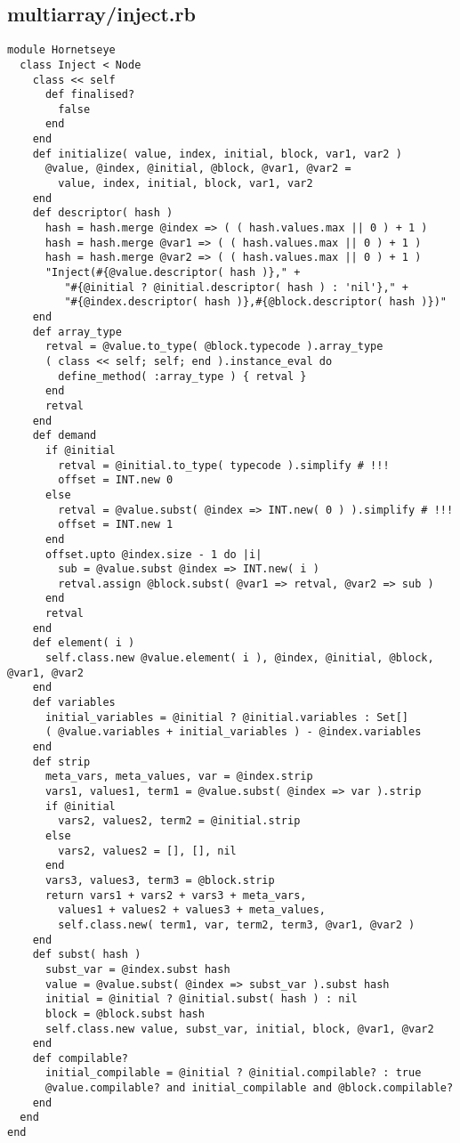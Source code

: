 \subsection{multiarray/inject.rb}\label{cha:multiarray-inject-rb}
\begin{lstlisting}
module Hornetseye
  class Inject < Node
    class << self
      def finalised?
        false
      end
    end
    def initialize( value, index, initial, block, var1, var2 )
      @value, @index, @initial, @block, @var1, @var2 =
        value, index, initial, block, var1, var2
    end
    def descriptor( hash )
      hash = hash.merge @index => ( ( hash.values.max || 0 ) + 1 )
      hash = hash.merge @var1 => ( ( hash.values.max || 0 ) + 1 )
      hash = hash.merge @var2 => ( ( hash.values.max || 0 ) + 1 )
      "Inject(#{@value.descriptor( hash )}," +
         "#{@initial ? @initial.descriptor( hash ) : 'nil'}," +
         "#{@index.descriptor( hash )},#{@block.descriptor( hash )})"
    end
    def array_type
      retval = @value.to_type( @block.typecode ).array_type
      ( class << self; self; end ).instance_eval do
        define_method( :array_type ) { retval }
      end
      retval
    end
    def demand
      if @initial
        retval = @initial.to_type( typecode ).simplify # !!!
        offset = INT.new 0
      else
        retval = @value.subst( @index => INT.new( 0 ) ).simplify # !!!
        offset = INT.new 1
      end
      offset.upto @index.size - 1 do |i|
        sub = @value.subst @index => INT.new( i )
        retval.assign @block.subst( @var1 => retval, @var2 => sub )
      end
      retval
    end
    def element( i )
      self.class.new @value.element( i ), @index, @initial, @block, @var1, @var2
    end
    def variables
      initial_variables = @initial ? @initial.variables : Set[]
      ( @value.variables + initial_variables ) - @index.variables
    end
    def strip
      meta_vars, meta_values, var = @index.strip
      vars1, values1, term1 = @value.subst( @index => var ).strip
      if @initial
        vars2, values2, term2 = @initial.strip
      else
        vars2, values2 = [], [], nil
      end
      vars3, values3, term3 = @block.strip
      return vars1 + vars2 + vars3 + meta_vars,
        values1 + values2 + values3 + meta_values,
        self.class.new( term1, var, term2, term3, @var1, @var2 )
    end
    def subst( hash )
      subst_var = @index.subst hash
      value = @value.subst( @index => subst_var ).subst hash
      initial = @initial ? @initial.subst( hash ) : nil
      block = @block.subst hash
      self.class.new value, subst_var, initial, block, @var1, @var2
    end
    def compilable?
      initial_compilable = @initial ? @initial.compilable? : true
      @value.compilable? and initial_compilable and @block.compilable?
    end
  end
end
\end{lstlisting}
